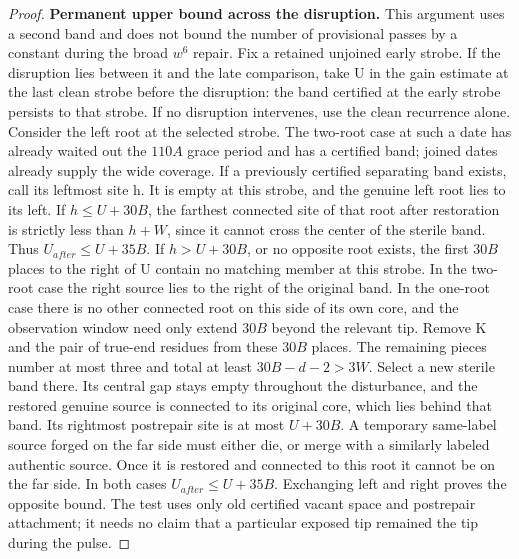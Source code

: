 \begin{proof}
\textbf{Permanent upper bound across the disruption.} This argument uses a second band and does not bound the number of provisional passes by a constant during the broad \(w^6\) repair. Fix a retained unjoined early strobe. If the disruption lies between it and the late comparison, take U in the gain estimate at the last clean strobe before the disruption: the band certified at the early strobe persists to that strobe. If no disruption intervenes, use the clean recurrence alone. Consider the left root at the selected strobe. The two-root case at such a date has already waited out the \(110A\) grace period and has a certified band; joined dates already supply the wide coverage. If a previously certified separating band exists, call its leftmost site h. It is empty at this strobe, and the genuine left root lies to its left. If \(h\le U+30B\), the farthest connected site of that root after restoration is strictly less than \(h+W\), since it cannot cross the center of the sterile band. Thus \(U_{after}\le U+35B\). If \(h>U+30B\), or no opposite root exists, the first \(30B\) places to the right of U contain no matching member at this strobe. In the two-root case the right source lies to the right of the original band. In the one-root case there is no other connected root on this side of its own core, and the observation window need only extend \(30B\) beyond the relevant tip. Remove K and the pair of true-end residues from these \(30B\) places. The remaining pieces number at most three and total at least \(30B-d-2>3W\). Select a new sterile band there. Its central gap stays empty throughout the disturbance, and the restored genuine source is connected to its original core, which lies behind that band. Its rightmost postrepair site is at most \(U+30B\). A temporary same-label source forged on the far side must either die, or merge with a similarly labeled authentic source. Once it is restored and connected to this root it cannot be on the far side. In both cases \(U_{after}\le U+35B\). Exchanging left and right proves the opposite bound. The test uses only old certified vacant space and postrepair attachment; it needs no claim that a particular exposed tip remained the tip during the pulse.


\end{proof}
